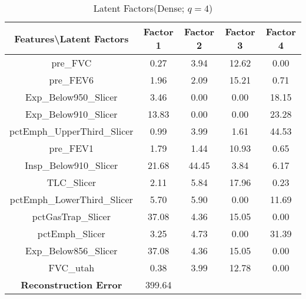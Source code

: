 \documentclass[11pt]{article}
\begin{document}
\begin{table}[ht]
\caption{Latent Factors(Dense; $q=4$)}
\centering
\begin{tabular}{c | c | c | c |c }
\hline\hline
Features\textbackslash Latent Factors & Factor 1 & Factor 2 & Factor 3 & Factor 4\\[1ex]
\hline
pre\_FVC  &  0.27  &  3.94  &  12.62  &  0.00 \\
pre\_FEV6  &  1.96  &  2.09  &  15.21  &  0.71 \\
Exp\_Below950\_Slicer  &  3.46  &  0.00  &  0.00  &  18.15 \\
Exp\_Below910\_Slicer  &  13.83  &  0.00  &  0.00  &  23.28 \\
pctEmph\_UpperThird\_Slicer  &  0.99  &  3.99  &  1.61  &  44.53 \\
pre\_FEV1  &  1.79  &  1.44  &  10.93  &  0.65 \\
Insp\_Below910\_Slicer  &  21.68  &  44.45  &  3.84  &  6.17 \\
TLC\_Slicer  &  2.11  &  5.84  &  17.96  &  0.23 \\
pctEmph\_LowerThird\_Slicer  &  5.70  &  5.90  &  0.00  &  11.69 \\
pctGasTrap\_Slicer  &  37.08  &  4.36  &  15.05  &  0.00 \\
pctEmph\_Slicer  &  3.25  &  4.73  &  0.00  &  31.39 \\
Exp\_Below856\_Slicer  &  37.08  &  4.36  &  15.05  &  0.00 \\
FVC\_utah  &  0.38  &  3.99  &  12.78  &  0.00 \\
\hline
\textbf{Reconstruction Error} & 399.64\\
\hline
\end{tabular}
\end{table}
\end{document}
